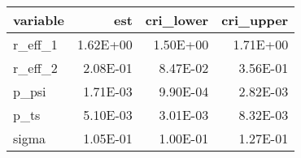 \begin{table}[ht]
\centering
\begin{tabular}{lrrr}
  \hline
variable & est & cri\_lower & cri\_upper \\ 
  \hline
r\_eff\_1 & 1.62E+00 & 1.50E+00 & 1.71E+00 \\ 
  r\_eff\_2 & 2.08E-01 & 8.47E-02 & 3.56E-01 \\ 
  p\_psi & 1.71E-03 & 9.90E-04 & 2.82E-03 \\ 
  p\_ts & 5.10E-03 & 3.01E-03 & 8.32E-03 \\ 
  sigma & 1.05E-01 & 1.00E-01 & 1.27E-01 \\ 
   \hline
\end{tabular}
\end{table}
